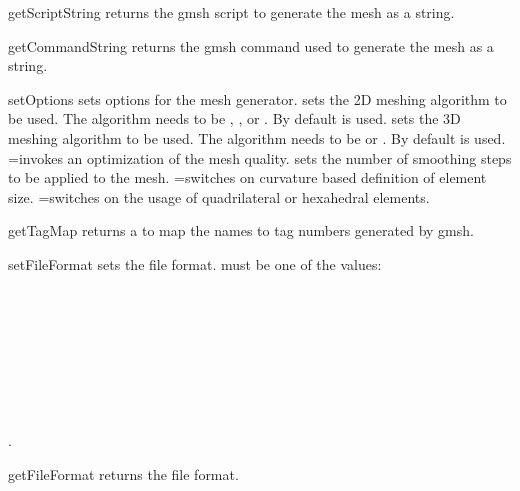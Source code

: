 \begin{methoddesc}[Design]{getScriptString}{}
returns the gmsh script to generate the mesh as a string.
\end{methoddesc}

\begin{methoddesc}[Design]{getCommandString}{}
returns the gmsh command used to generate the mesh as a string.
\end{methoddesc}

\begin{methoddesc}[Design]{setOptions}{
}
sets options for the mesh generator.
 sets the 2D meshing algorithm to be used.
The algorithm needs to be , ,
or . By default  is used.
 sets the 3D  meshing algorithm to be used.
The algorithm needs to be  or .
By default  is used.
=\True invokes an optimization of the mesh quality.
 sets the number of smoothing steps to be applied to the mesh.
=\True switches on curvature based
definition of element size.
=\True switches on the usage of quadrilateral or
hexahedral elements.
\end{methoddesc}

\begin{methoddesc}[Design]{getTagMap}{}
returns a  to map the  names to tag numbers
generated by gmsh.
\end{methoddesc}

\begin{methoddesc}[Design]{setFileFormat}{}
sets the file format.  must be one of the values:\\
\\
\\
\\
\\
\\
\\
\\
\\
.
\end{methoddesc}

\begin{methoddesc}[Design]{getFileFormat}{}
returns the file format.
\end{methoddesc}

